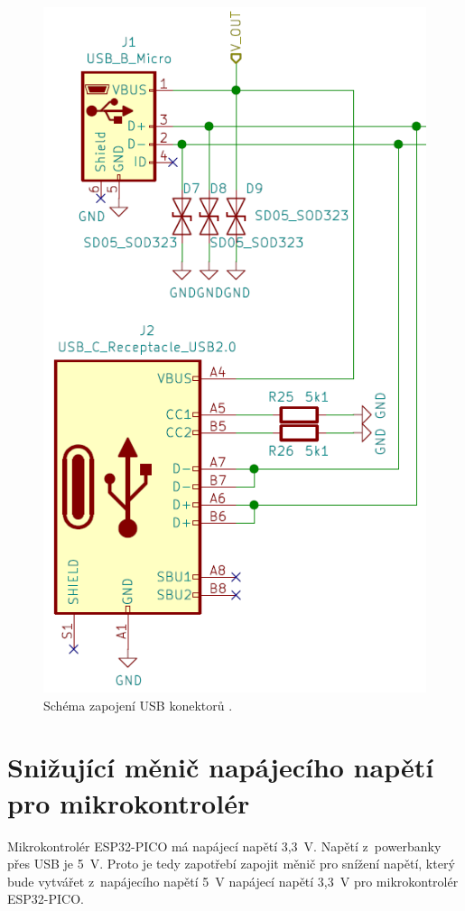   \begin{figure}[!h]
    \begin{center}
      \includegraphics[scale=0.5]{obrazky/Obe_USB_schema.png}
    \end{center}
    \caption[Schéma zapojení USB konektorů \cite{USB-C}]{Schéma zapojení USB konektorů \cite{USB-C}.}
  \end{figure}

  \section{Snižující měnič napájecího napětí pro mikrokontrolér}
  Mikrokontrolér ESP32-PICO má napájecí napětí 3,3~V. Napětí z~powerbanky přes USB je 5~V. Proto je tedy zapotřebí zapojit 
  měnič pro snížení napětí, který bude vytvářet z~napájecího napětí 5~V napájecí napětí 3,3~V pro mikrokontrolér ESP32-PICO.

